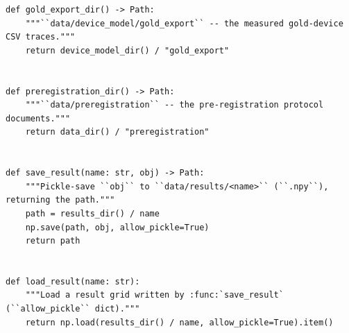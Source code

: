 \begin{lstlisting}[caption={mrl\_trace/paths.py},label={lst:siox-src-paths}]
def gold_export_dir() -> Path:
    """``data/device_model/gold_export`` -- the measured gold-device CSV traces."""
    return device_model_dir() / "gold_export"


def preregistration_dir() -> Path:
    """``data/preregistration`` -- the pre-registration protocol documents."""
    return data_dir() / "preregistration"


def save_result(name: str, obj) -> Path:
    """Pickle-save ``obj`` to ``data/results/<name>`` (``.npy``), returning the path."""
    path = results_dir() / name
    np.save(path, obj, allow_pickle=True)
    return path


def load_result(name: str):
    """Load a result grid written by :func:`save_result` (``allow_pickle`` dict)."""
    return np.load(results_dir() / name, allow_pickle=True).item()
\end{lstlisting}

